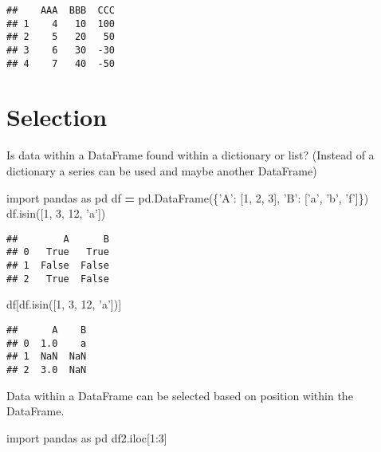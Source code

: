 \documentclass[]{book}
\newenvironment{Shaded}{\begin{snugshade}}{\end{snugshade}}
\newcommand{\DecValTok}[1]{\textcolor[rgb]{0.00,0.00,0.81}{#1}}
\newcommand{\ImportTok}[1]{#1}
\newcommand{\NormalTok}[1]{#1}
\newcommand{\OperatorTok}[1]{\textcolor[rgb]{0.81,0.36,0.00}{\textbf{#1}}}
\newcommand{\StringTok}[1]{\textcolor[rgb]{0.31,0.60,0.02}{#1}}
\begin{document}
\begin{verbatim}
##    AAA  BBB  CCC
## 1    4   10  100
## 2    5   20   50
## 3    6   30  -30
## 4    7   40  -50
\end{verbatim}

\hypertarget{selection}{%
\section{Selection}\label{selection}}

Is data within a DataFrame found within a dictionary or list? (Instead of a dictionary a series can be used and maybe another DataFrame)

\begin{Shaded}
\begin{Highlighting}[]
\ImportTok{import}\NormalTok{ pandas }\ImportTok{as}\NormalTok{ pd}
\NormalTok{df }\OperatorTok{=}\NormalTok{ pd.DataFrame(\{}\StringTok{'A'}\NormalTok{: [}\DecValTok{1}\NormalTok{, }\DecValTok{2}\NormalTok{, }\DecValTok{3}\NormalTok{], }\StringTok{'B'}\NormalTok{: [}\StringTok{'a'}\NormalTok{, }\StringTok{'b'}\NormalTok{, }\StringTok{'f'}\NormalTok{]\})}
\NormalTok{df.isin([}\DecValTok{1}\NormalTok{, }\DecValTok{3}\NormalTok{, }\DecValTok{12}\NormalTok{, }\StringTok{'a'}\NormalTok{])}
\end{Highlighting}
\end{Shaded}

\begin{verbatim}
##        A      B
## 0   True   True
## 1  False  False
## 2   True  False
\end{verbatim}

\begin{Shaded}
\begin{Highlighting}[]
\NormalTok{df[df.isin([}\DecValTok{1}\NormalTok{, }\DecValTok{3}\NormalTok{, }\DecValTok{12}\NormalTok{, }\StringTok{'a'}\NormalTok{])]}
\end{Highlighting}
\end{Shaded}

\begin{verbatim}
##      A    B
## 0  1.0    a
## 1  NaN  NaN
## 2  3.0  NaN
\end{verbatim}

Data within a DataFrame can be selected based on position within the DataFrame.

\begin{Shaded}
\begin{Highlighting}[]
\ImportTok{import}\NormalTok{ pandas }\ImportTok{as}\NormalTok{ pd}
\NormalTok{df2.iloc[}\DecValTok{1}\NormalTok{:}\DecValTok{3}\NormalTok{]}
\end{Highlighting}
\end{Shaded}
\end{document}

